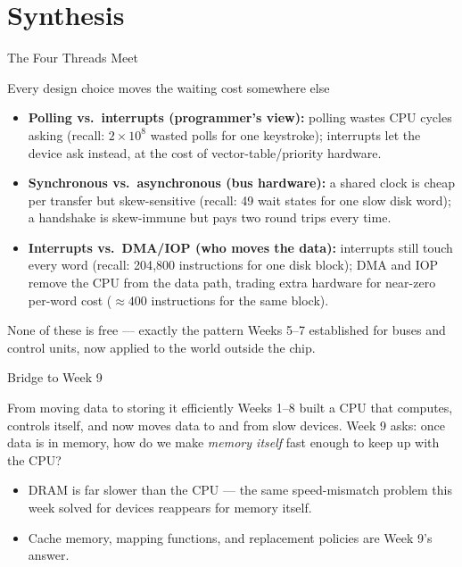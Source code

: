 \documentclass[aspectratio=169]{beamer}
\begin{document}
\section{Synthesis}


\begin{frame}{The Four Threads Meet}
  \begin{block}{Every design choice moves the waiting cost somewhere else}
    \begin{itemize}
      \item \textbf{Polling vs.\ interrupts (programmer's view):} polling
        wastes CPU cycles asking (recall: $2\times10^8$ wasted polls for one
        keystroke); interrupts let the device ask instead, at the cost of
        vector-table/priority hardware.
      \item \textbf{Synchronous vs.\ asynchronous (bus hardware):} a shared
        clock is cheap per transfer but skew-sensitive (recall: 49 wait
        states for one slow disk word); a handshake is skew-immune but pays
        two round trips every time.
      \item \textbf{Interrupts vs.\ DMA/IOP (who moves the data):}
        interrupts still touch every word (recall: 204{,}800 instructions
        for one disk block); DMA and IOP remove the CPU from the data path,
        trading extra hardware for near-zero per-word cost ($\approx 400$
        instructions for the same block).
    \end{itemize}
  \end{block}
  None of these is free --- exactly the pattern Weeks 5--7 established for
  buses and control units, now applied to the world outside the chip.
\end{frame}

\begin{frame}{Bridge to Week 9}
  \begin{exampleblock}{From moving data to storing it efficiently}
    Weeks 1--8 built a CPU that computes, controls itself, and now moves data
    to and from slow devices. Week 9 asks: once data is in memory, how do we
    make \emph{memory itself} fast enough to keep up with the CPU?
  \end{exampleblock}
  \begin{itemize}
    \item DRAM is far slower than the CPU --- the same speed-mismatch problem
      this week solved for devices reappears for memory itself.
    \item Cache memory, mapping functions, and replacement policies are
      Week 9's answer.
  \end{itemize}
\end{frame}
\end{document}

